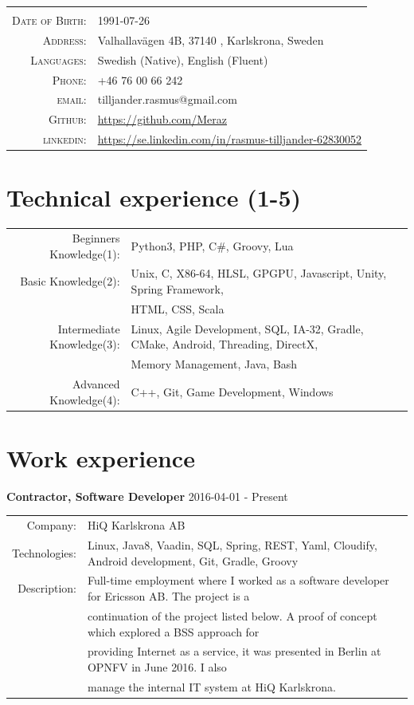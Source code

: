 \documentclass[a4paper,10pt]{article}
\begin{document}
\begin{tabular}{rl}
    \textsc{} &    \\
    \textsc{Date of Birth:} &  1991-07-26   \\
    \textsc{Address:}   & Valhallavägen 4B, 37140 , Karlskrona, Sweden \\
    \textsc{Languages:}  & Swedish (Native), English (Fluent) \\
    \textsc{Phone:}     & +46 76 00 66 242\\
    \textsc{email:}     & tilljander.rasmus@gmail.com\\
    \textsc{Github:}  & \url{https://github.com/Meraz}\\
    \textsc{linkedin:}  & \url{https://se.linkedin.com/in/rasmus-tilljander-62830052}
\end{tabular}
\section{Technical experience (1-5)}
\begin{tabular}{rl}
Beginners Knowledge(1):& Python3, PHP, C\#, Groovy, Lua\\
Basic Knowledge(2):& Unix, C, X86-64, HLSL, GPGPU, Javascript, Unity, Spring Framework,\\& HTML, CSS, Scala \\
Intermediate Knowledge(3):& Linux, Agile Development, SQL, IA-32, Gradle, CMake, Android, Threading,  DirectX, \\& Memory Management, Java, Bash\\
Advanced Knowledge(4):& C++, Git, Game Development, Windows
\end{tabular}

\section{Work experience}
\textbf{Contractor, Software Developer} 2016-04-01 - Present \\
\begin{tabular}{rl}
Company:& HiQ Karlskrona AB \\
Technologies:&  Linux, Java8, Vaadin, SQL, Spring, REST, Yaml, Cloudify, Android development, Git, Gradle, Groovy\\
Description:& Full-time employment where I worked as a software developer for Ericsson AB. The project is a\\&
continuation of the project listed below. A proof of concept which explored a BSS approach for\\&
providing Internet as a service, it was presented in Berlin at OPNFV in June 2016. I also\\&
manage the internal IT system at HiQ Karlskrona.
\end{tabular}\\
\end{document}
